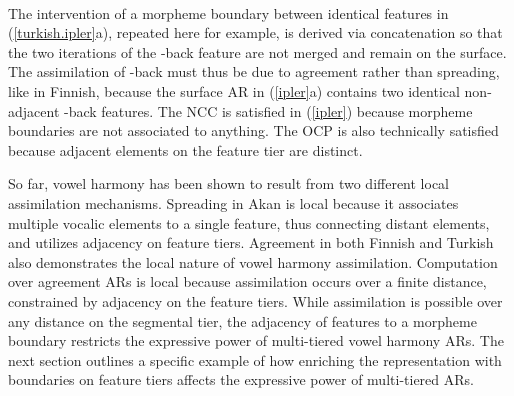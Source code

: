 \documentclass[,doc,floatsintext]{apa6}
\theoremstyle{definition}
\theoremstyle{definition}
\theoremstyle{definition}
\theoremstyle{remark}
\begin{document}
\begin{exe}
\label{ipler} \\
\end{exe}

\noindent The intervention of a morpheme boundary between identical
features in (\ref{turkish.ipler}a), repeated here for example, is
derived via concatenation so that the two iterations of the -back
feature are not merged and remain on the surface. The assimilation of
-back must thus be due to agreement rather than spreading, like in
Finnish, because the surface AR in (\ref{ipler}a) contains two identical
non-adjacent -back features. The NCC is satisfied in (\ref{ipler})
because morpheme boundaries are not associated to anything. The OCP is
also technically satisfied because adjacent elements on the feature tier
are distinct.

So far, vowel harmony has been shown to result from two different local
assimilation mechanisms. Spreading in Akan is local because it
associates multiple vocalic elements to a single feature, thus
connecting distant elements, and utilizes adjacency on feature tiers.
Agreement in both Finnish and Turkish also demonstrates the local nature
of vowel harmony assimilation. Computation over agreement ARs is local
because assimilation occurs over a finite distance, constrained by
adjacency on the feature tiers. While assimilation is possible over any
distance on the segmental tier, the adjacency of features to a morpheme
boundary restricts the expressive power of multi-tiered vowel harmony
ARs. The next section outlines a specific example of how enriching the
representation with boundaries on feature tiers affects the expressive
power of multi-tiered ARs.
\end{document}
